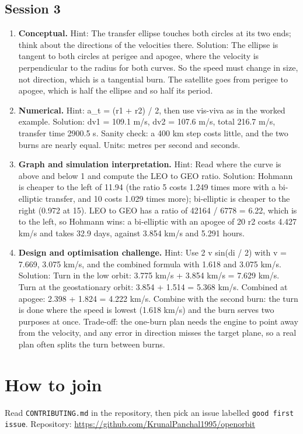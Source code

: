 \documentclass[11pt,a4paper]{article}
\begin{document}
\subsection*{Session 3}
\begin{enumerate}[nosep]
\item \textbf{Conceptual.} Hint: The transfer ellipse touches both circles at its two ends; think about the directions of the velocities there. Solution: The ellipse is tangent to both circles at perigee and apogee, where the velocity is perpendicular to the radius for both curves. So the speed must change in size, not direction, which is a tangential burn. The satellite goes from perigee to apogee, which is half the ellipse and so half its period.
\item \textbf{Numerical.} Hint: a\_t = (r1 + r2) / 2, then use vis-viva as in the worked example. Solution: dv1 = 109.1 m/s, dv2 = 107.6 m/s, total 216.7 m/s, transfer time 2900.5 s. Sanity check: a 400 km step costs little, and the two burns are nearly equal. Units: metres per second and seconds.
\item \textbf{Graph and simulation interpretation.} Hint: Read where the curve is above and below 1 and compute the LEO to GEO ratio. Solution: Hohmann is cheaper to the left of 11.94 (the ratio 5 costs 1.249 times more with a bi-elliptic transfer, and 10 costs 1.029 times more); bi-elliptic is cheaper to the right (0.972 at 15). LEO to GEO has a ratio of 42164 / 6778 = 6.22, which is to the left, so Hohmann wins: a bi-elliptic with an apogee of 20 r2 costs 4.427 km/s and takes 32.9 days, against 3.854 km/s and 5.291 hours.
\item \textbf{Design and optimisation challenge.} Hint: Use 2 v sin(di / 2) with v = 7.669, 3.075 km/s, and the combined formula with 1.618 and 3.075 km/s. Solution: Turn in the low orbit: 3.775 km/s + 3.854 km/s = 7.629 km/s. Turn at the geostationary orbit: 3.854 + 1.514 = 5.368 km/s. Combined at apogee: 2.398 + 1.824 = 4.222 km/s. Combine with the second burn: the turn is done where the speed is lowest (1.618 km/s) and the burn serves two purposes at once. Trade-off: the one-burn plan needs the engine to point away from the velocity, and any error in direction misses the target plane, so a real plan often splits the turn between burns.
\end{enumerate}

\section{How to join}
Read \texttt{CONTRIBUTING.md} in the repository, then pick an issue labelled \texttt{good first issue}. Repository: \url{https://github.com/KrunalPanchal1995/openorbit}
\end{document}
